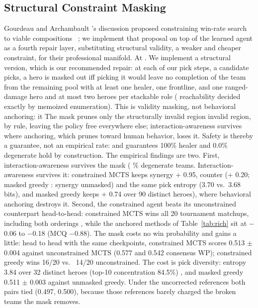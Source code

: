 \documentclass[journal]{IEEEtran}
\providecommand{\DIFaddtex}[1]{{\protect\color{blue} \sf #1}} %
\providecommand{\DIFdeltex}[1]{{\protect\color{red} \scriptsize #1}} %
\providecommand{\DIFaddbegin}{} %
\providecommand{\DIFaddend}{} %
\providecommand{\DIFdelbegin}{} %
\providecommand{\DIFdelend}{} %
\providecommand{\DIFadd}[1]{\texorpdfstring{\DIFaddtex{#1}}{#1}} %
\providecommand{\DIFdel}[1]{\texorpdfstring{\DIFdeltex{#1}}{}} %
\begin{document}
\subsection{Structural Constraint Masking}
\label{sec:constrained}

Gourdeau and Archambault \DIFdelbegin \DIFdel{'s discussion }\DIFdelend proposed constraining win-rate search to viable compositions~\cite{gourdeau2021discriminative}\DIFdelbegin \DIFdel{; we implement that proposal on top of the learned agent as a fourth repair layer, substituting structural validity, a weaker and cheaper constraint, for their professional manifold. At }\DIFdelend \DIFaddbegin \DIFadd{. We implement a structural version, which is our recommended repair: at }\DIFaddend each of our \DIFdelbegin \DIFdel{pick steps, a candidate }\DIFdelend \DIFaddbegin \DIFadd{picks, a }\DIFaddend hero is masked out iff picking it would leave no completion \DIFdelbegin \DIFdel{of the team }\DIFdelend from the remaining pool with at least one healer, one frontline, and one ranged-damage hero and at most two heroes per stackable role (\DIFdelbegin \DIFdel{reachability }\DIFdelend decided exactly by memoized enumeration). \DIFdelbegin \DIFdel{This is validity masking, not behavioral anchoring: it }\DIFdelend \DIFaddbegin \DIFadd{The mask }\DIFaddend prunes only the \DIFdelbegin \DIFdel{structurally invalid region}\DIFdelend \DIFaddbegin \DIFadd{invalid region, }\DIFaddend by rule, \DIFdelbegin \DIFdel{leaving the policy free everywhere else; interaction-awareness survives where anchoring, which prunes toward human behavior, loses it. Safety is thereby a guarantee, not an empirical rate: }\DIFdelend \DIFaddbegin \DIFadd{and guarantees }\DIFaddend 100\% healer and \DIFdelbegin \DIFdel{0.0\% degenerate hold by construction. The empirical findings are two. First, interaction-awareness survives the mask (}\DIFdelend \DIFaddbegin \DIFadd{0\% degenerate teams. Interaction-awareness survives it: constrained MCTS keeps }\DIFaddend synergy +\DIFdelbegin \DIFdel{0.95, counter }\DIFdelend \DIFaddbegin \DIFadd{0.71 (}\DIFaddend +\DIFdelbegin \DIFdel{0.20; masked greedy : synergy }\DIFdelend \DIFaddbegin \DIFadd{0.86 unmasked) and the same pick entropy (3.70 vs.\ 3.68 bits), and masked greedy keeps }\DIFaddend +\DIFdelbegin \DIFdel{0.74 over 90 distinct heroes), where behavioral anchoring destroys it. Second, the constrained agent beats its unconstrained counterpart head-to-head: constrained MCTS wins all 20 tournament matchups, including both orderings }\DIFdelend \DIFaddbegin \DIFadd{0.32, while the anchored methods of Table~\ref{tab:rich} sit at $-$0.06 to $-$0.18 (MCQ $-$0.88). The mask costs no win probability and gains a little: head to head with the same checkpoints, constrained MCTS scores 0.513 $\pm$ 0.004 }\DIFaddend against unconstrained MCTS\DIFdelbegin \DIFdel{(0.577 and 0.542 consensus WP); constrained greedy wins 16/20 vs. \ 14/20 unconstrained. The cost is pick diversity: entropy 3.84 over 32 distinct heroes (top-10 concentration 84.5\%)}\DIFdelend \DIFaddbegin \DIFadd{, and masked greedy 0.511 $\pm$ 0.003 against unmasked greedy. Under the uncorrected references both pairs tied (0.497, 0.500), because those references barely charged the broken teams the mask removes}\DIFaddend .
\end{document}
